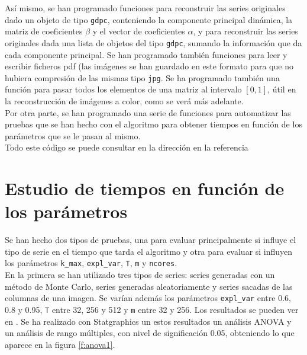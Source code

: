 Así mismo, se han programado funciones para reconstruir las series originales dado un objeto de tipo \texttt{gdpc}, conteniendo la componente principal dinámica, la matriz de coeficientes $\beta$ y el vector de coeficientes $\alpha$, y para reconstruir las series originales dada una lista de objetos del tipo \texttt{gdpc}, sumando la información que da cada componente principal. Se han programado también funciones para leer y escribir ficheros pdf (las imágenes se han guardado en este formato para que no hubiera compresión de las mismas tipo \texttt{jpg}. Se ha programado también una función para pasar todos los elementos de una matriz al intervalo $[0,1]$, útil en la reconstrucción de imágenes a color, como se verá más adelante.\\

Por otra parte, se han programado una serie de funciones para automatizar las pruebas que se han hecho con el algoritmo para obtener tiempos en función de los parámetros que se le pasan al mismo.\\

Todo este código se puede consultar en la dirección en la referencia %


\section{Estudio de tiempos en función de los parámetros}

Se han hecho dos tipos de pruebas, una para evaluar principalmente si influye el tipo de serie en el tiempo que tarda el algoritmo y otra para evaluar si influyen los parámetros \texttt{k\_max}, \texttt{expl\_var}, \texttt{T}, \texttt{m} y \texttt{ncores}.\\

En la primera se han utilizado tres tipos de series: series generadas con un método de Monte Carlo, series generadas aleatoriamente y series sacadas de las columnas de una imagen. Se varían además los parámetros \texttt{expl\_var} entre 0.6, 0.8 y 0.95, \texttt{T} entre 32, 256 y 512 y \texttt{m} entre 32 y 256. Los resultados se pueden ver en \cite{anabel}.
Se ha realizado con Statgraphics un estos resultados un análisis ANOVA y un análisis de rango múltiples, con nivel de significación 0.05, obteniendo lo que aparece en la figura \ref{f:anova1}.\\

